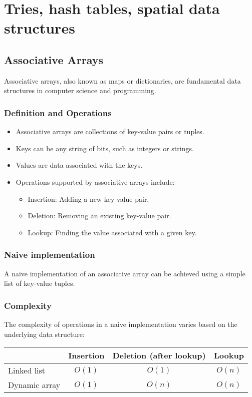 \documentclass[12pt]{article}
\begin{document}
\newpage
\section{Tries, hash tables, spatial data structures}

\subsection{Associative Arrays}
Associative arrays, also known as maps or dictionaries, are fundamental data structures in computer science and programming.

\subsubsection{Definition and Operations}
\begin{itemize}
    \item Associative arrays are collections of key-value pairs or tuples.
    \item Keys can be any string of bits, such as integers or strings.
    \item Values are data associated with the keys.
    \item Operations supported by associative arrays include:
    \begin{itemize}
        \item Insertion: Adding a new key-value pair.
        \item Deletion: Removing an existing key-value pair.
        \item Lookup: Finding the value associated with a given key.
    \end{itemize}
\end{itemize}



\subsubsection{Naive implementation}
A naive implementation of an associative array can be achieved using a simple list of key-value tuples.

\subsubsection{Complexity}
The complexity of operations in a naive implementation varies based on the underlying data structure:\\

\begin{tabular}{lccc}
\hline
& Insertion & Deletion (after lookup) & Lookup \\
\hline
Linked list & $O(1)$ & $O(1)$ & $O(n)$ \\
Dynamic array & $O(1)$ & $O(n)$ & $O(n)$ \\
\hline
\end{tabular}
\end{document}
